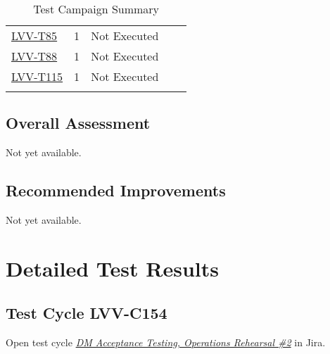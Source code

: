 \documentclass[DM,lsstdraft,STR,toc]{lsstdoc}
\begin{document}
{\begin{longtable}{p{2cm}cp{2.3cm}p{8.6cm}p{2.3cm}}
\begin{minipage}[]{9cm}
\medskip
\end{minipage}
&
\\\hline
\href{https://jira.lsstcorp.org/secure/Tests.jspa#/testCase/LVV-T85}{LVV-T85}
&  1
& Not Executed &
\begin{minipage}[]{9cm}
\smallskip

\medskip
\end{minipage}
&
\\\hline
\href{https://jira.lsstcorp.org/secure/Tests.jspa#/testCase/LVV-T88}{LVV-T88}
&  1
& Not Executed &
\begin{minipage}[]{9cm}
\smallskip

\medskip
\end{minipage}
&
\\\hline
\href{https://jira.lsstcorp.org/secure/Tests.jspa#/testCase/LVV-T115}{LVV-T115}
&  1
& Not Executed &
\begin{minipage}[]{9cm}
\smallskip

\medskip
\end{minipage}
&
\\\hline
\caption{Test Campaign Summary}
\label{table:summary}
\end{longtable}
}

\subsection{Overall Assessment}
\label{sect:overallassessment}

Not yet available.

\subsection{Recommended Improvements}
\label{sect:recommendations}

Not yet available.

\newpage
\section{Detailed Test Results}
\label{sect:detailedtestresults}

\subsection{Test Cycle LVV-C154 }

Open test cycle {\it \href{https://jira.lsstcorp.org/secure/Tests.jspa#/testrun/LVV-C154}{DM Acceptance Testing, Operations Rehearsal \#2}} in Jira.
\end{document}
